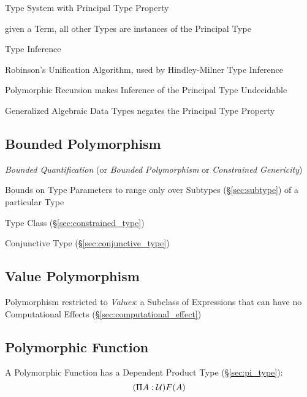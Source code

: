 Type System with Principal Type Property

given a Term, all other Types are instances of the Principal Type

Type Inference

Robinson's Unification Algorithm, used by Hindley-Milner Type
Inference

Polymorphic Recursion makes Inference of the Principal Type Undecidable

Generalized Algebraic Data Types negates the Principal Type Property



\subsection{Bounded Polymorphism}\label{sec:bounded_polymorphism}

\emph{Bounded Quantification} (or \emph{Bounded Polymorphism} or
\emph{Constrained Genericity})

Bounds on Type Parameters to range only over Subtypes
(\S\ref{sec:subtype}) of a particular Type

Type Class (\S\ref{sec:constrained_type})

Conjunctive Type (\S\ref{sec:conjunctive_type})



\subsection{Value Polymorphism}\label{sec:value_polymorphism}

Polymorphism restricted to \emph{Values}: a Subclass of Expressions
that can have no Computational Effects
(\S\ref{sec:computational_effect})



\subsection{Polymorphic Function}\label{sec:polymorphic_function}

A Polymorphic Function has a Dependent Product Type
(\S\ref{sec:pi_type}):
\[
  (\Pi A:\mathcal{U}) F(A)
\]



